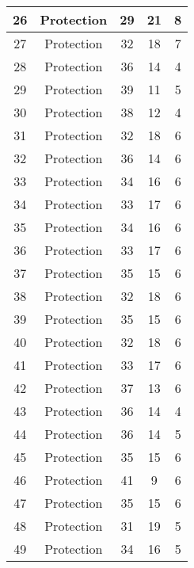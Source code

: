 \documentclass[results.tex]{subfiles}
\begin{document}
\begin{center}
\begin{tabular}{| c || c | c | c | c |}
    \hline
    26 & Protection & 29 & 21 & 8 \\ 
    \hline
    27 & Protection & 32 & 18 & 7 \\ 
    \hline
    28 & Protection & 36 & 14 & 4 \\ 
    \hline
    29 & Protection & 39 & 11 & 5 \\ 
    \hline
    30 & Protection & 38 & 12 & 4 \\ 
    \hline
    31 & Protection & 32 & 18 & 6 \\ 
    \hline
    32 & Protection & 36 & 14 & 6 \\ 
    \hline
    33 & Protection & 34 & 16 & 6 \\ 
    \hline
    34 & Protection & 33 & 17 & 6 \\ 
    \hline
    35 & Protection & 34 & 16 & 6 \\ 
    \hline
    36 & Protection & 33 & 17 & 6 \\ 
    \hline
    37 & Protection & 35 & 15 & 6 \\ 
    \hline
    38 & Protection & 32 & 18 & 6 \\ 
    \hline
    39 & Protection & 35 & 15 & 6 \\ 
    \hline
    40 & Protection & 32 & 18 & 6 \\ 
    \hline
    41 & Protection & 33 & 17 & 6 \\ 
    \hline
    42 & Protection & 37 & 13 & 6 \\ 
    \hline
    43 & Protection & 36 & 14 & 4 \\ 
    \hline
    44 & Protection & 36 & 14 & 5 \\ 
    \hline
    45 & Protection & 35 & 15 & 6 \\ 
    \hline
    46 & Protection & 41 & 9 & 6 \\ 
    \hline
    47 & Protection & 35 & 15 & 6 \\ 
    \hline
    48 & Protection & 31 & 19 & 5 \\ 
    \hline
    49 & Protection & 34 & 16 & 5 \\ 
    \hline   \end{tabular}
\end{center}
\end{document}
